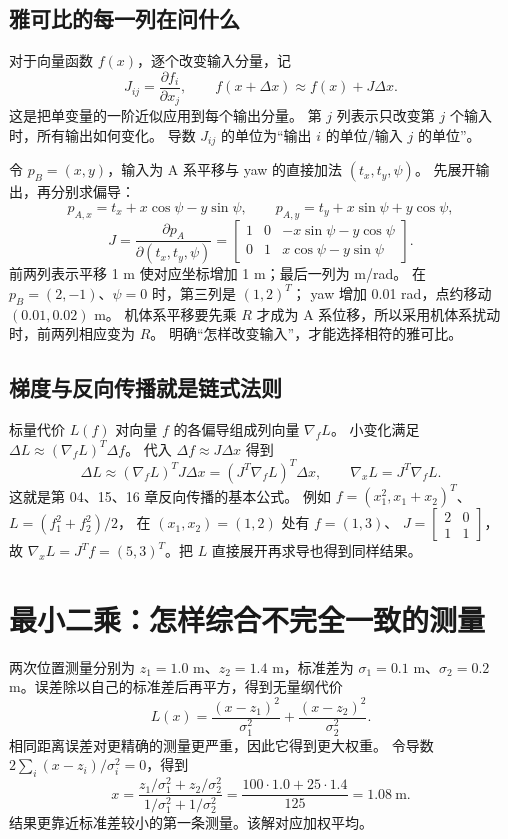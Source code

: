 \subsection{雅可比的每一列在问什么}
对于向量函数 $f(x)$，逐个改变输入分量，记
\[
 J_{ij}=\frac{\partial f_i}{\partial x_j},\qquad
 f(x+\Delta x)\approx f(x)+J\Delta x.
\]
这是把单变量的一阶近似应用到每个输出分量。
第 $j$ 列表示只改变第 $j$ 个输入时，所有输出如何变化。
导数 $J_{ij}$ 的单位为“输出 $i$ 的单位/输入 $j$ 的单位”。

令 $p_B=(x,y)$，输入为 A 系平移与 yaw 的直接加法 $(t_x,t_y,\psi)$。
先展开输出，再分别求偏导：
\[
 p_{A,x}=t_x+x\cos\psi-y\sin\psi,\qquad
 p_{A,y}=t_y+x\sin\psi+y\cos\psi,
\]
\[
 J=\frac{\partial p_A}{\partial(t_x,t_y,\psi)}=
 \begin{bmatrix}1&0&-x\sin\psi-y\cos\psi\\
 0&1&x\cos\psi-y\sin\psi\end{bmatrix}.
\]
前两列表示平移 1 m 使对应坐标增加 1 m；最后一列为 m/rad。
在 $p_B=(2,-1)$、$\psi=0$ 时，第三列是 $(1,2)^T$；
yaw 增加 0.01 rad，点约移动 $(0.01,0.02)$ m。
机体系平移要先乘 $R$ 才成为 A 系位移，所以采用机体系扰动时，前两列相应变为 $R$。
明确“怎样改变输入”，才能选择相符的雅可比。

\subsection{梯度与反向传播就是链式法则}
标量代价 $L(f)$ 对向量 $f$ 的各偏导组成列向量 $\nabla_fL$。
小变化满足 $\Delta L\approx(\nabla_fL)^T\Delta f$。
代入 $\Delta f\approx J\Delta x$ 得到
\[
 \Delta L\approx(\nabla_fL)^TJ\Delta x
    =(J^T\nabla_fL)^T\Delta x,\qquad
 \nabla_xL=J^T\nabla_fL.
\]
这就是第 04、15、16 章反向传播的基本公式。
例如 $f=(x_1^2,x_1+x_2)^T$、$L=(f_1^2+f_2^2)/2$，
在 $(x_1,x_2)=(1,2)$ 处有 $f=(1,3)$、
$J=\left[\begin{smallmatrix}2&0\\1&1\end{smallmatrix}\right]$，
故 $\nabla_xL=J^Tf=(5,3)^T$。把 $L$ 直接展开再求导也得到同样结果。

\section{最小二乘：怎样综合不完全一致的测量}
两次位置测量分别为 $z_1=1.0$ m、$z_2=1.4$ m，标准差为
$\sigma_1=0.1$ m、$\sigma_2=0.2$ m。误差除以自己的标准差后再平方，得到无量纲代价
\[
 L(x)=\frac{(x-z_1)^2}{\sigma_1^2}+\frac{(x-z_2)^2}{\sigma_2^2}.
\]
相同距离误差对更精确的测量更严重，因此它得到更大权重。
令导数 $2\sum_i(x-z_i)/\sigma_i^2=0$，得到
\[
 x=\frac{z_1/\sigma_1^2+z_2/\sigma_2^2}{1/\sigma_1^2+1/\sigma_2^2}
   =\frac{100\cdot1.0+25\cdot1.4}{125}=1.08\ \mathrm m.
\]
结果更靠近标准差较小的第一条测量。该解对应加权平均。

